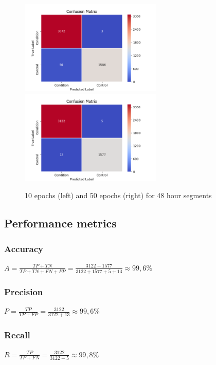 \begin{figure}
      \begin{multicols}{2}
            \includegraphics[height=4.5cm]{img/control_condition/conf_2880_60_10_32.png}
            \includegraphics[height=4.5cm]{img/control_condition/conf_2880_60_50_32.png}
      \end{multicols}
      \caption{10 epochs (left) and 50 epochs (right) for 48 hour segments}
      \label{figure:control_condition_confusion_matrix_48h}
\end{figure}


\subsection{Performance metrics}

\subsubsection{Accuracy}
$ A = \frac{TP+TN}{TP+TN+FN+FP} = \frac{3122+1577}{3122+1577+5+13} \approx 99,6\%$

\subsubsection{Precision}
$ P = \frac{TP}{TP+FP} = \frac{3122}{3122+13} \approx 99,6\%$

\subsubsection{Recall}
$ R = \frac{TP}{TP+FN} = \frac{3122}{3122+5} \approx 99,8\%$

